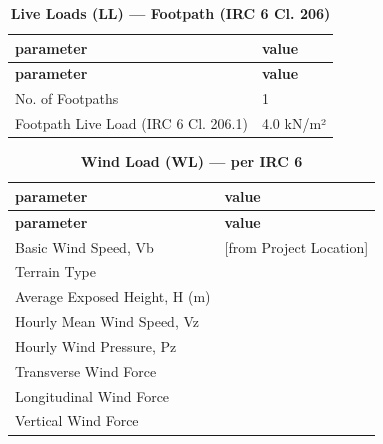 \vspace{1em}
\begin{longtable}{|L{5.5cm}|p{10.0cm}|}
\caption{\textbf{Live Loads (LL) --- Footpath (IRC 6 Cl. 206)}}
\hline
\textbf{parameter} & \textbf{value} \\
\hline
\endfirsthead

\hline
\textbf{parameter} & \textbf{value} \\
\hline
\endhead
\textnormal{No. of Footpaths} & 1 \\[6pt]
\hline
\textnormal{Footpath Live Load (IRC 6 Cl. 206.1)} & 4.0 kN/m² \\[6pt]
\hline
\end{longtable}

\vspace{1em}
\begin{longtable}{|L{5.5cm}|p{10.0cm}|}
\caption{\textbf{Wind Load (WL) --- per IRC 6}}
\hline
\textbf{parameter} & \textbf{value} \\
\hline
\endfirsthead

\hline
\textbf{parameter} & \textbf{value} \\
\hline
\endhead
\textnormal{Basic Wind Speed, Vb} &  [from Project Location] \\[6pt]
\hline
\textnormal{Terrain Type} &  \\[6pt]
\hline
\textnormal{Average Exposed Height, H (m)} &  \\[6pt]
\hline
\textnormal{Hourly Mean Wind Speed, Vz} &  \\[6pt]
\hline
\textnormal{Hourly Wind Pressure, Pz} &  \\[6pt]
\hline
\textnormal{Transverse Wind Force} &  \\[6pt]
\hline
\textnormal{Longitudinal Wind Force} &  \\[6pt]
\hline
\textnormal{Vertical Wind Force} &  \\[6pt]
\hline
\end{longtable}

